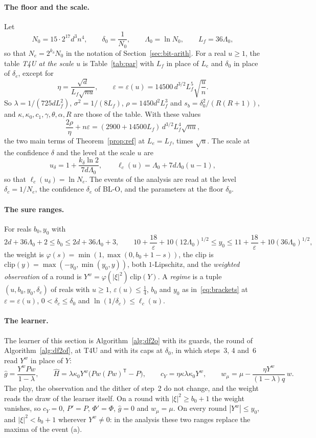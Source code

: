 \documentclass[11pt]{amsart}
\theoremstyle{definition}
\numberwithin{equation}{section}
\begin{document}
\paragraph{The floor and the scale.} Let
\[
N_0=15\cdot2^{17}d^3n^4,\qquad\delta_0=\frac1{N_0},\qquad\Lambda_0=\ln N_0,\qquad L_f=36\Lambda_0 ,
\]
so that $N_e=2^{k_\delta}N_0$ in the notation of Section~\ref{sec:bit-arith}. For a real $u\ge1$, the table \emph{T4U at the scale $u$} is Table~\ref{tab:par} with $L_f$ in place of $L_e$ and $\delta_0$ in place of $\delta_e$, except for
\[
\eta=\frac{\sqrt d}{L_f\sqrt{nu}},\qquad\varepsilon=\varepsilon(u)=14500\,d^{3/2}L_f^5\sqrt{\frac un} .
\]
So $\lambda=1/(725dL_f^2)$, $\sigma^2=1/(8L_f)$, $\rho=1450d^2L_f^3$ and $s_b=\delta_0^2/(R(R+1))$, and $\kappa,\kappa_0,c_1,\gamma,\theta,\alpha,R$ are those of the table. With these values
\[
\frac{2\rho}\eta+n\varepsilon=(2900+14500L_f)\,d^{3/2}L_f^4\sqrt{nu},
\]
the two main terms of Theorem~\ref{prop:ref} at $L_e=L_f$, times $\sqrt u$. The scale at the confidence $\delta$ and the level at the scale $u$ are
\[
u_\delta=1+\frac{k_\delta\ln2}{7d\Lambda_0},\qquad\ell_c(u)=\Lambda_0+7d\Lambda_0(u-1),
\]
so that $\ell_c(u_\delta)=\ln N_e$. The events of the analysis are read at the level $\delta_c=1/N_e$, the confidence $\delta_e$ of BL-O, and the parameters at the floor $\delta_0$.

\paragraph{The sure ranges.} For reals $b_0,y_0$ with
\begin{equation}\label{eq:brackets}
2d+36\Lambda_0+2\le b_0\le2d+36\Lambda_0+3,\qquad10+\frac{18}\varepsilon+10(12\Lambda_0)^{1/2}\le y_0\le11+\frac{18}\varepsilon+10(36\Lambda_0)^{1/2},
\end{equation}
the weight is $\varphi(s)=\min(1,\max(0,b_0+1-s))$, the clip is $\mathrm{clip}(y)=\max(-y_0,\min(y_0,y))$, both $1$-Lipschitz, and the \emph{weighted observation} of a round is $Y^w=\varphi(|\xi|^2)\,\mathrm{clip}(Y)$. A \emph{regime} is a tuple $(u,b_0,y_0,\delta_c)$ of reals with $u\ge1$, $\varepsilon(u)\le\frac14$, $b_0$ and $y_0$ as in~\eqref{eq:brackets} at $\varepsilon=\varepsilon(u)$, $0<\delta_c\le\delta_0$ and $\ln(1/\delta_c)\le\ell_c(u)$.

\paragraph{The learner.} The learner of this section is Algorithm~\ref{alg:df2o} with its guards, the round of Algorithm~\ref{alg:df2of}, at T4U and with its caps at $\delta_0$, in which steps~3, 4 and~6 read $Y^w$ in place of $Y$:
\[
\hat g=\frac{Y^wPw}{1-\lambda},\qquad\hat H=\lambda\kappa_0Y^w\bigl(Pw(Pw)^{\mathsf T}-P\bigr),\qquad c_Y=\eta\kappa\lambda\kappa_0Y^w,\qquad w_\mu=\mu-\frac{\eta Y^w}{(1-\lambda)q}\,w .
\]
The play, the observation and the dither of step~2 do not change, and the weight reads the draw of the learner itself. On a round with $|\xi|^2\ge b_0+1$ the weight vanishes, so $c_Y=0$, $P'=P$, $\Phi'=\Phi$, $\hat g=0$ and $w_\mu=\mu$. On every round $|Y^w|\le y_0$, and $|\xi|^2<b_0+1$ wherever $Y^w\ne0$: in the analysis these two ranges replace the maxima of the event (a).
\end{document}
